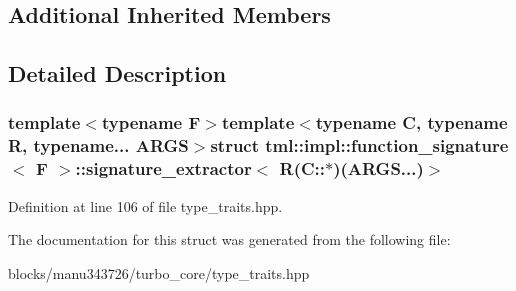 \subsection*{Additional Inherited Members}


\subsection{Detailed Description}
\subsubsection*{template$<$typename F$>$template$<$typename C, typename R, typename... A\+R\+G\+S$>$struct tml\+::impl\+::function\+\_\+signature$<$ F $>$\+::signature\+\_\+extractor$<$ R(\+C\+::$\ast$)(\+A\+R\+G\+S...)$>$}



Definition at line 106 of file type\+\_\+traits.\+hpp.



The documentation for this struct was generated from the following file\+:\begin{DoxyCompactItemize}
\item 
blocks/manu343726/turbo\+\_\+core/type\+\_\+traits.\+hpp\end{DoxyCompactItemize}
